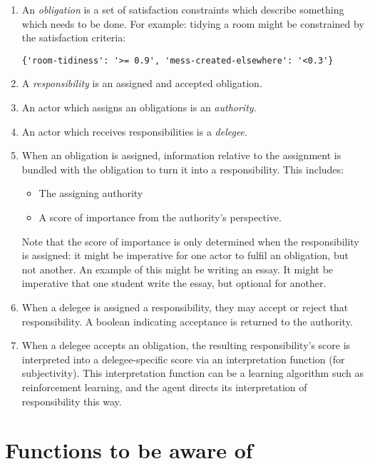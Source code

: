 \documentclass{article}
\begin{document}
\begin{enumerate}
   \item An \emph{obligation} is a set of satisfaction constraints which describe something which needs to be done.\newline
         For example: tidying a room might be constrained by the satisfaction criteria: \begin{verbatim}{'room-tidiness': '>= 0.9', 'mess-created-elsewhere': '<0.3'}\end{verbatim}
         \item A \emph{responsibility} is an assigned and accepted obligation. 
         \item An actor which assigns an obligations is an \emph{authority}.
         \item An actor which receives responsibilities is a \emph{delegee}.
         \item When an obligation is assigned, information relative to the assignment is bundled with the obligation to turn it into a responsibility. This includes:
         \begin{itemize}
             \item The assigning authority
             \item A score of importance from the authority's perspective.
         \end{itemize}
         Note that the score of importance is only determined when the responsibility is assigned: it might be imperative for one actor to fulfil an obligation, but not another. An example of this might be writing an essay. It might be imperative that one student write the essay, but optional for another.
         \item When a delegee is assigned a responsibility, they may accept or reject that responsibility. A boolean indicating acceptance is returned to the authority.
         \item When a delegee accepts an obligation, the resulting responsibility's score is interpreted into a delegee-specific score via an interpretation function (for subjectivity).\newline
         This interpretation function can be a learning algorithm such as reinforcement learning, and the agent directs its interpretation of responsibility this way.
\end{enumerate}

\bigskip

\section{Functions to be aware of}
\end{document}
